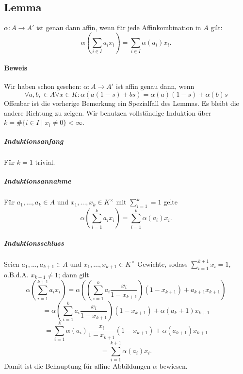 \subsection{Lemma}
	\begin{Lemma}
		$ \alpha:A\to A' $ ist genau dann affin, wenn für jede Affinkombination in $ A $ gilt:
			\[ \alpha(\sum_{i\in I}a_ix_i) = \sum_{i\in I} \alpha(a_i)x_i. \]
	\end{Lemma}
	
\paragraph{Beweis}
	Wir haben schon gesehen: $ \alpha:A\to A' $ ist affin genau dann, wenn
		\[ \forall a,b,\in A\forall x\in K:\alpha(a(1-s)+bs) = \alpha(a)(1-s)+\alpha(b)s \]
	Offenbar ist die vorherige Bemerkung ein Spezialfall des Lemmas. Es bleibt die andere Richtung zu zeigen. Wir benutzen vollständige Induktion über $k = \#\{{i\in I}\mid x_i\neq 0\}<\infty $.
	
\subparagraph{Induktionsanfang}
	Für $ k=1 $ trivial.

\subparagraph{Induktionsannahme}
	Für $ a_1,...,a_k\in A $ und $ x_1,...,x_k \in K^\times$ mit $ \sum_{i=1}^{k}=1 $ gelte
		\[ \alpha(\sum_{i=1}^{k}a_ix_i) = \sum_{i=1}^{k}\alpha(a_i)x_i. \]
	
\subparagraph{Induktionsschluss}
	Seien $ a_1,...,a_{k+1} \in A$ und $ x_1,...,x_{k+1} \in K^\times$ Gewichte, sodass $ \sum_{i=1}^{k+1}x_i = 1 $, o.B.d.A. $ x_{k+1}\neq 1 $; dann gilt
		\[ \alpha(\sum_{i=1}^{k+1}a_ix_i) = \alpha((\sum_{i=1}^{k}a_i\frac{x_i}{1-x_{k+1}})(1-x_{k+1})+a_{k+1}x_{k+1}) \]
		\[ = \alpha(\sum_{i=1}^{k}a_i\frac{x_i}{1-x_{k+1}})(1-x_{k+1})+\alpha(a_k+1)x_{k+1} \]
		\[ = \sum_{i=1}^{k}\alpha(a_i)\frac{x_i}{1-x_{k+1}}(1-x_{k+1})+\alpha(a_{k+1})x_{k+1} \]
		\[ = \sum_{i=1}^{k+1}\alpha(a_i)x_i. \]
	Damit ist die Behauptung für affine Abbildungen $ \alpha $ bewiesen. 